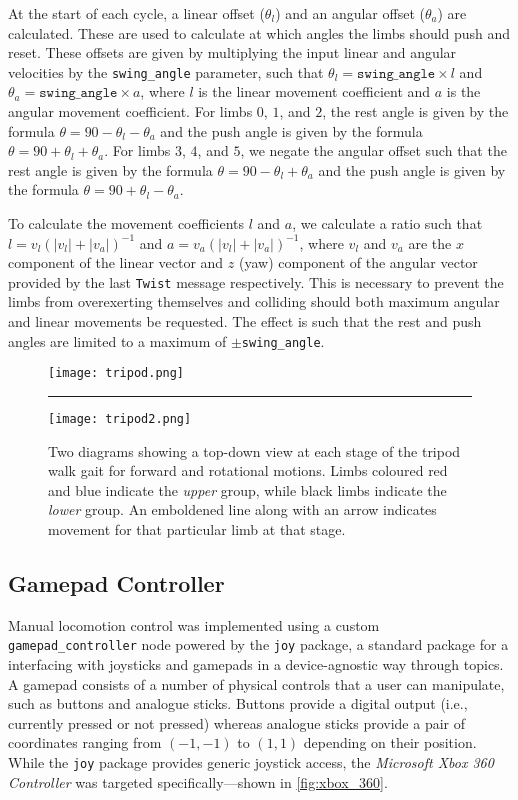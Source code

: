 At the start of each cycle, a linear offset ($\theta_l$) and an angular offset ($\theta_a$) are calculated. These are used to calculate at which angles the limbs should push and reset. These offsets are given by multiplying the input linear and angular velocities by the \texttt{swing\_angle} parameter, such that $\theta_l = \texttt{swing\_angle} \times l$ and $\theta_a = \texttt{swing\_angle} \times a$, where $l$ is the linear movement coefficient and $a$ is the angular movement coefficient. For limbs $0$, $1$, and $2$, the rest angle is given by the formula $\theta = 90 - \theta_l - \theta_a$ and the push angle is given by the formula $\theta = 90 + \theta_l + \theta_a$. For limbs $3$, $4$, and $5$, we negate the angular offset such that the rest angle is given by the formula $\theta = 90 - \theta_l + \theta_a$ and the push angle is given by the formula $\theta = 90 + \theta_l - \theta_a$.

To calculate the movement coefficients $l$ and $a$, we calculate a ratio such that $l = v_l(|v_l| + |v_a|)^{-1}$ and $a = v_a(|v_l| + |v_a|)^{-1}$, where $v_l$ and $v_a$ are the $x$ component of the linear vector and $z$ (yaw) component of the angular vector provided by the last \texttt{Twist} message respectively. This is necessary to prevent the limbs from overexerting themselves and colliding should both maximum angular and linear movements be requested. The effect is such that the rest and push angles are limited to a maximum of $\pm$\texttt{swing\_angle}.

\begin{figure}[!h]
    \centering
    \texttt{[image: tripod.png]}
    \vspace{1em}
    \hrule
    \vspace{1em}
    \texttt{[image: tripod2.png]}
    \caption{Two diagrams showing a top-down view at each stage of the tripod walk gait for forward and rotational motions. Limbs coloured red and blue indicate the \emph{upper} group, while black limbs indicate the \emph{lower} group. An emboldened line along with an arrow indicates movement for that particular limb at that stage.}
    \label{fig:tripod_gait_forward}
\end{figure}


\subsection{Gamepad Controller}

Manual locomotion control was implemented using a custom \texttt{gamepad\_controller} node powered by the \texttt{joy} package, a standard package for a interfacing with joysticks and gamepads in a device-agnostic way through topics. A gamepad consists of a number of physical controls that a user can manipulate, such as buttons and analogue sticks. Buttons provide a digital output (i.e., currently pressed or not pressed) whereas analogue sticks provide a pair of coordinates ranging from $(-1, -1)$ to $(1, 1)$ depending on their position. While the \texttt{joy} package provides generic joystick access, the \emph{Microsoft Xbox 360 Controller} was targeted specifically---shown in \autoref{fig:xbox_360}.

